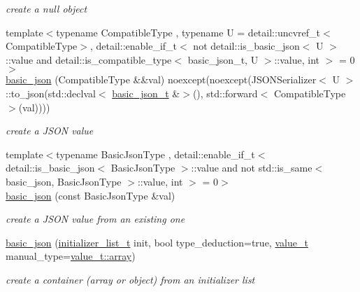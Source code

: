 \begin{DoxyCompactItemize}
\begin{DoxyCompactList}\small\item\em create a null object \end{DoxyCompactList}\item 
{\footnotesize template$<$typename Compatible\+Type , typename U  = detail\+::uncvref\+\_\+t$<$\+Compatible\+Type$>$, detail\+::enable\+\_\+if\+\_\+t$<$ not detail\+::is\+\_\+basic\+\_\+json$<$ U $>$\+::value and detail\+::is\+\_\+compatible\+\_\+type$<$ basic\+\_\+json\+\_\+t, U $>$\+::value, int $>$  = 0$>$ }\\\mbox{\hyperlink{classnlohmann_1_1basic__json_a5a6558bfd1be139a638f91f0e09fc737}{basic\+\_\+json}} (Compatible\+Type \&\&val) noexcept(noexcept(J\+S\+O\+N\+Serializer$<$ U $>$\+::to\+\_\+json(std\+::declval$<$ \mbox{\hyperlink{classnlohmann_1_1basic__json_afff7860310ae69f29f8158a77ec0ef13}{basic\+\_\+json\+\_\+t}} \&$>$(), std\+::forward$<$ Compatible\+Type $>$(val))))
\begin{DoxyCompactList}\small\item\em create a J\+S\+ON value \end{DoxyCompactList}\item 
{\footnotesize template$<$typename Basic\+Json\+Type , detail\+::enable\+\_\+if\+\_\+t$<$ detail\+::is\+\_\+basic\+\_\+json$<$ Basic\+Json\+Type $>$\+::value and not std\+::is\+\_\+same$<$ basic\+\_\+json, Basic\+Json\+Type $>$\+::value, int $>$  = 0$>$ }\\\mbox{\hyperlink{classnlohmann_1_1basic__json_aa16dc469c842fa8a0aaf6f5a95c46bb3}{basic\+\_\+json}} (const Basic\+Json\+Type \&val)
\begin{DoxyCompactList}\small\item\em create a J\+S\+ON value from an existing one \end{DoxyCompactList}\item 
\mbox{\hyperlink{classnlohmann_1_1basic__json_ab5dfd9a2b2663b219641cb7fe59b6da2}{basic\+\_\+json}} (\mbox{\hyperlink{classnlohmann_1_1basic__json_ad70a098fbc01c53497db29d3b5b656a9}{initializer\+\_\+list\+\_\+t}} init, bool type\+\_\+deduction=true, \mbox{\hyperlink{namespacenlohmann_1_1detail_a1ed8fc6239da25abcaf681d30ace4985}{value\+\_\+t}} manual\+\_\+type=\mbox{\hyperlink{namespacenlohmann_1_1detail_a1ed8fc6239da25abcaf681d30ace4985af1f713c9e000f5d3f280adbd124df4f5}{value\+\_\+t\+::array}})
\begin{DoxyCompactList}\small\item\em create a container (array or object) from an initializer list \end{DoxyCompactList}\item 

\end{DoxyCompactItemize}
